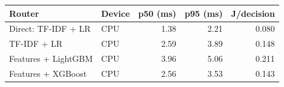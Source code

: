 \setlength{\tabcolsep}{4pt}
\begin{tabular}{@{}llrrr@{}}
\toprule
Router & Device & p50 (ms) & p95 (ms) & J/decision \\
\midrule
Direct: TF-IDF + LR & CPU & 1.38 & 2.21 & 0.080 \\
TF-IDF + LR & CPU & 2.59 & 3.89 & 0.148 \\
Features + LightGBM & CPU & 3.96 & 5.06 & 0.211 \\
Features + XGBoost & CPU & 2.56 & 3.53 & 0.143 \\
\bottomrule
\end{tabular}
